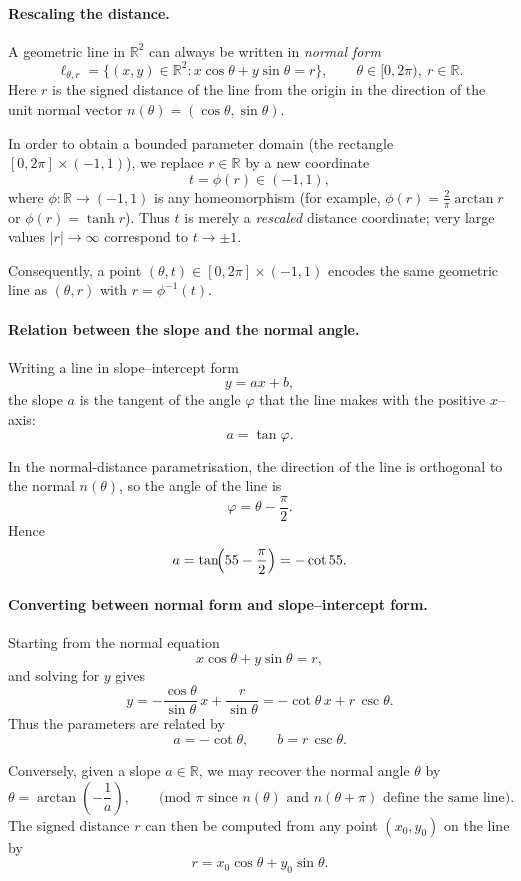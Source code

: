 \documentclass[12pt,a4paper]{article}
\theoremstyle{plain}
\theoremstyle{definition}      %
\begin{document}
	\paragraph{Rescaling the distance.}
	A geometric line in $\mathbb{R}^2$ can always be written in \emph{normal form}
	\[
	\ell_{\theta,r}
	= \{(x,y)\in\mathbb{R}^2 : x\cos\theta + y\sin\theta = r\},
	\qquad \theta\in[0,2\pi),\ r\in\mathbb{R}.
	\]
	Here $r$ is the signed distance of the line from the origin in the direction
	of the unit normal vector $n(\theta)=(\cos\theta,\sin\theta)$.
	
	In order to obtain a bounded parameter domain (the rectangle
	$[0,2\pi]\times(-1,1)$), we replace $r\in\mathbb{R}$ by a new coordinate
	\[
	t = \phi(r) \in (-1,1),
	\]
	where $\phi:\mathbb{R}\to(-1,1)$ is any homeomorphism (for example,
	$\displaystyle \phi(r)=\tfrac{2}{\pi}\arctan r$ or $\phi(r)=\tanh r$).
	Thus $t$ is merely a \emph{rescaled} distance coordinate; very large values
	$|r|\to\infty$ correspond to $t\to\pm 1$.
	
	Consequently, a point $(\theta,t)\in[0,2\pi]\times(-1,1)$ encodes the same
	geometric line as $(\theta,r)$ with $r=\phi^{-1}(t)$.
	
	\paragraph{Relation between the slope and the normal angle.}
	Writing a line in slope--intercept form
	\[
	y = ax + b,
	\]
	the slope $a$ is the tangent of the angle $\varphi$ that the line makes with
	the positive $x$--axis:
	\[
	a = \tan\varphi.
	\]
	
	In the normal-distance parametrisation, the direction of the line is
	orthogonal to the normal $n(\theta)$, so the angle of the line is
	\[
	\varphi = \theta - \frac{\pi}{2}.
	\]
	Hence
	\[
	a = \tan\!\Bigl(\theta - \frac{\pi}{2}\Bigr)
	= -\cot\theta.
	\]
	
	\paragraph{Converting between normal form and slope--intercept form.}
	Starting from the normal equation
	\[
	x\cos\theta + y\sin\theta = r,
	\]
	and solving for $y$ gives
	\[
	y
	= -\frac{\cos\theta}{\sin\theta}\,x
	+ \frac{r}{\sin\theta}
	= -\cot\theta\,x + r\,\csc\theta.
	\]
	Thus the parameters are related by
	\[
	a = -\cot\theta,
	\qquad
	b = r\,\csc\theta.
	\]
	
	Conversely, given a slope $a\in\mathbb{R}$, we may recover the normal angle
	$\theta$ by
	\[
	\theta = \arctan\!\left(-\frac{1}{a}\right),
	\qquad
	\text{(mod $\pi$ since $n(\theta)$ and $n(\theta+\pi)$ define the same line).}
	\]
	The signed distance $r$ can then be computed from any point $(x_0,y_0)$ on the
	line by
	\[
	r = x_0\cos\theta + y_0\sin\theta.
	\]
	
\end{document}
